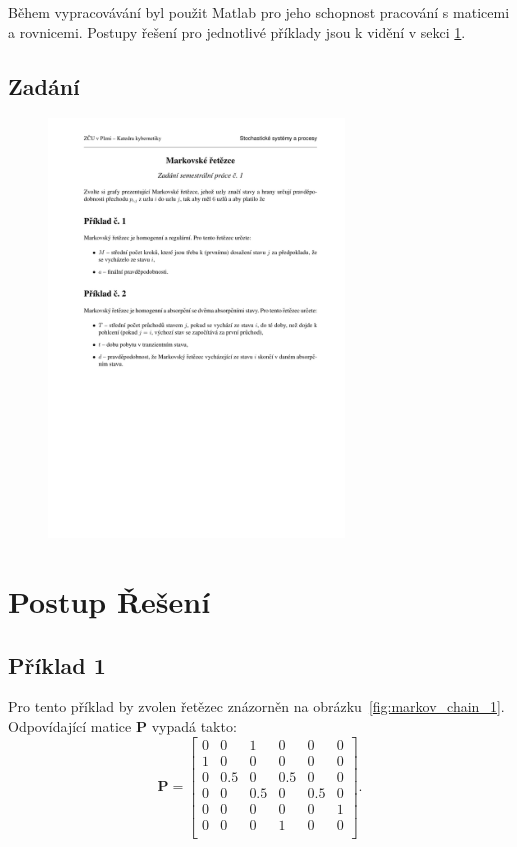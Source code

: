 \documentclass{article}
\begin{document}
Během vypracovávání byl použit Matlab pro jeho schopnost pracování s maticemi a rovnicemi. Postupy řešení pro jednotlivé příklady jsou k vidění v sekci \ref{sec:postup}.




\subsection{Zadání}\label{ssec:zadani}
\begin{figure} [htb!]
    \centering
    \includegraphics[width = 0.7\textwidth]{zadani.pdf}
\end{figure}
\clearpage
\section{Postup Řešení}\label{sec:postup}
\subsection{Příklad 1}
Pro tento příklad by zvolen řetězec znázorněn na obrázku~\ref{fig:markov_chain_1}. Odpovídající matice $\mathbf{P}$ vypadá takto: 
\[
\mathbf{P} =
\begin{bmatrix}
0 & 0 & 1 & 0 & 0 & 0 \\
1 & 0 & 0 & 0 & 0 & 0 \\
0 & 0.5 & 0 & 0.5 & 0 & 0 \\
0 & 0 & 0.5 & 0 & 0.5 & 0 \\
0 & 0 & 0 & 0 & 0 & 1 \\
0 & 0 & 0 & 1 & 0 & 0 \\
\end{bmatrix}.
\]
\end{document}
